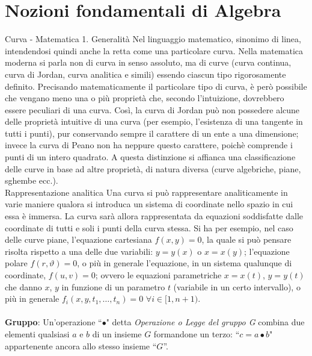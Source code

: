 \documentclass[a4paper,12pt]{tesiinfo}
\begin{document}
\chapter{Nozioni fondamentali di Algebra}
Curva - Matematica
1. Generalit\`a
Nel linguaggio matematico, sinonimo di linea, intendendosi quindi anche la retta come una particolare curva.  Nella matematica moderna si parla  non di curva in senso assoluto, ma  di curve (curva continua, curva di Jordan, curva analitica e simili) essendo ciascun tipo rigorosamente definito. Precisando matematicamente il particolare tipo di curva, \`e per\`o possibile che vengano meno una o pi\`u propriet\`a che, secondo l'intuizione, dovrebbero essere peculiari di una curva. Cos\`i, la curva di Jordan pu\`o non possedere alcune delle propriet\`a intuitive di una curva (per esempio, l'esistenza di una tangente in tutti i punti), pur conservando sempre il carattere di un ente a una dimensione; invece la curva di Peano non ha neppure questo carattere, poich\`e comprende i punti di un intero quadrato. A questa distinzione si affianca una classificazione delle curve in base ad altre propriet\`a, di natura diversa (curve algebriche, piane, sghembe ecc.).
\\
Rappresentazione analitica
Una curva si pu\`o rappresentare analiticamente in varie maniere qualora si introduca un sistema di coordinate nello spazio in cui essa \`e immersa. La curva sar\`a allora rappresentata da equazioni soddisfatte dalle coordinate di tutti e soli i punti della curva stessa. Si ha per esempio, nel caso delle curve piane, l'equazione cartesiana $f (x, y)=0$, la quale si pu\`o pensare risolta rispetto a una delle due variabili: $y=y (x)$ o $x=x (y)$; l'equazione polare $f (r, \vartheta)=0$, o pi\`u in generale l'equazione, in un sistema qualunque di coordinate, $f (u, v)=0$; ovvero le equazioni parametriche $x=x (t)$, $y=y (t)$ che danno $x$, $y$ in funzione di un parametro $t$ (variabile in un certo intervallo), o pi\`u in generale $f_i (x, y, t_1 , \ldots, t_n )=0$ $\forall i \in [1, n+1)$.
%
%
%
\\
\\
\textbf{Gruppo}: Un'operazione ``$\bullet$" detta \textit{Operazione o Legge del gruppo G} combina due elementi qualsiasi $a$ e $b$ di un insieme $G$ formandone un terzo: ``$c = a\bullet b$" appartenente ancora allo stesso insieme ``$G$''. 
\end{document}
